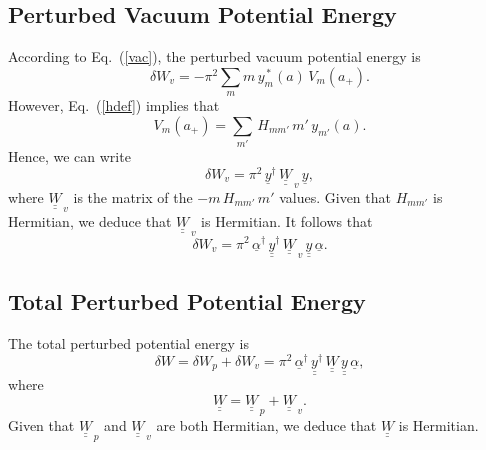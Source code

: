 \documentclass[12pt,prb,aps,notitlepage]{revtex4-1}
\begin{document}
\subsection{Perturbed Vacuum Potential Energy}
According to Eq.~(\ref{vac}), the perturbed vacuum potential energy is
\begin{equation}
\delta W_v = - \pi^2\sum_m m\,y_m^{\,\ast}(a)\,V_m(a_+).
\end{equation}
However, Eq.~(\ref{hdef}) implies that
\begin{equation}
V_m(a_+) = \sum_{m'}\,H_{mm'}\,m'\,y_{m'}(a).
\end{equation}
Hence, we can write
\begin{equation}
\delta W_v = \pi^2\,\underline{y}^\dag\,\underline{\underline{W}}_{\,v}\,\underline{y},
\end{equation}
where $\underline{\underline{W}}_{\,v}$ is the matrix of the $-m\,H_{mm'}\,m'$ values. Given that $H_{mm'}$ is Hermitian, we deduce that $\underline{\underline{W}}_{\,v}$ 
is Hermitian. It follows that
\begin{equation}
\delta W_v = \pi^2\,\underline{\alpha}^\dag\,\underline{\underline{y}}^\dag\,\underline{\underline{W}}_{\,v}\,\underline{\underline{y}}\,\underline{\alpha}.
\end{equation}

\subsection{Total Perturbed Potential Energy}
The total perturbed potential energy is
\begin{equation}
\delta W = \delta W_p + \delta W_v = \pi^2\,\underline{\alpha}^\dag\,\underline{\underline{y}}^\dag\,\underline{\underline{W}}\,\underline{\underline{y}}\,\underline{\alpha},
\end{equation}
where 
\begin{equation}
\underline{\underline{W}} = \underline{\underline{W}}_{\,p} + \underline{\underline{W}}_{\,v}.
\end{equation}
Given that $\underline{\underline{W}}_{\,p}$ and $\underline{\underline{W}}_{\,v}$ are both Hermitian, we deduce that $\underline{\underline{W}}$ is Hermitian.
\end{document}
